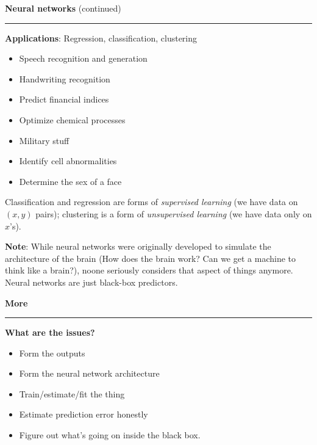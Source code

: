 \documentclass[12pt,letterpaper]{article}
\newcommand{\HRule}{\rule{\linewidth}{4pt}}
\newcommand{\vsphalf}{\vspace*{0.5cm}}
\newcommand{\vspone}{\vspace*{1cm}}
\begin{document}
\newpage

\fontsize{30}{30} \selectfont

\centerline{\textbf{Neural networks} (continued)}

\HRule

\vsphalf

\fontsize{20}{25} \selectfont

\textbf{Applications}: Regression, classification, clustering

\begin{itemize}
\item Speech recognition and generation
\item Handwriting recognition
\item Predict financial indices
\item Optimize chemical processes
\item Military stuff
\item Identify cell abnormalities
\item Determine the sex of a face
\end{itemize}

\bigskip

Classification and regression are forms of \emph{supervised
learning\/} (we have data on $(x,y)$ pairs); clustering is a form of
\emph{unsupervised learning\/} (we have data only on $x$'s).

\vspone

\textbf{Note}: While neural networks were originally developed to
simulate the architecture of the brain (How does the brain work?  Can
we get a machine to think like a brain?), noone seriously considers
that aspect of things anymore.  Neural networks are just black-box
predictors.



\newpage

\fontsize{30}{30} \selectfont

\centerline{\textbf{More}}

\HRule

\vsphalf

\fontsize{20}{25} \selectfont

\textbf{What are the issues?}
\begin{itemize}
\item Form the outputs
\item Form the neural network architecture
\item Train/estimate/fit the thing
\item Estimate prediction error honestly
\item Figure out what's going on inside the black box.
\end{itemize}
\end{document}
